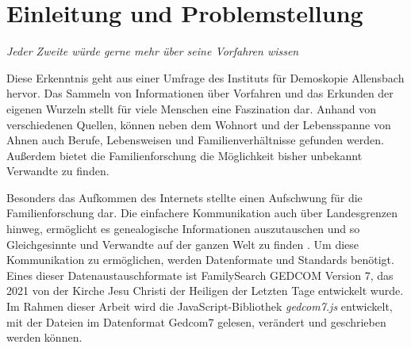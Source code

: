 \chapter{Einleitung und Problemstellung}
\label{chap: Einleitung und Problemstellung}
\begin{center}
	\textit{Jeder Zweite würde gerne mehr über seine Vorfahren wissen} \cite{DemoskopieAllensbach2007}
\end{center}
Diese Erkenntnis geht aus einer Umfrage des Instituts für Demoskopie Allensbach hervor. Das Sammeln von Informationen über Vorfahren und das Erkunden der eigenen Wurzeln stellt für viele Menschen eine Faszination dar. Anhand von verschiedenen Quellen, können neben dem Wohnort und der Lebensspanne von Ahnen auch Berufe, Lebensweisen und Familienverhältnisse gefunden werden. Außerdem bietet die Familienforschung die Möglichkeit bisher unbekannt Verwandte zu finden. \cite{Malteser}

Besonders das Aufkommen des Internets stellte einen Aufschwung für die Familienforschung dar. Die einfachere Kommunikation auch über Landesgrenzen hinweg, ermöglicht es genealogische Informationen auszutauschen und so Gleichgesinnte und Verwandte auf der ganzen Welt zu finden \cite{AhnenforschungDE}. Um diese Kommunikation zu ermöglichen, werden Datenformate und Standards benötigt. Eines dieser Datenaustauschformate ist  FamilySearch GEDCOM Version 7, das 2021 von der Kirche Jesu Christi der Heiligen der Letzten Tage entwickelt wurde. Im Rahmen dieser Arbeit wird die JavaScript-Bibliothek \textit{gedcom7.js} entwickelt, mit der Dateien im Datenformat Gedcom7 gelesen, verändert und geschrieben werden können. 

